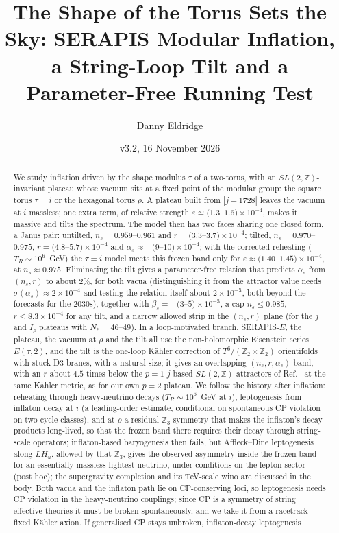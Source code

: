 \documentclass[aps,prd,twocolumn,superscriptaddress,nofootinbib,floatfix]{revtex4-2}
\begin{document}
\title{The Shape of the Torus Sets the Sky: SERAPIS Modular Inflation, a String-Loop Tilt and a Parameter-Free Running Test}
\author{Danny Eldridge}
\date{v3.2, 16 November 2026}
\begin{abstract}
We study inflation driven by the shape modulus $\tau$ of a two-torus, with an $SL(2,\mathbb{Z})$-invariant plateau whose vacuum sits at a fixed point of the modular group: the square torus $\tau=i$ or the hexagonal torus $\rho$. A plateau built from $|j-1728|$ leaves the vacuum at $i$ massless; one extra term, of relative strength $\varepsilon\simeq(1.3$--$1.6)\times10^{-4}$, makes it massive and tilts the spectrum. The model then has two faces sharing one closed form, a Janus pair: untilted, $n_s=0.959$--$0.961$ and $r=(3.3$--$3.7)\times10^{-4}$; tilted, $n_s=0.970$--$0.975$, $r=(4.8$--$5.7)\times10^{-4}$ and $\alpha_s\approx-(9$--$10)\times10^{-4}$; with the corrected reheating ($T_R\sim10^6$~GeV) the $\tau=i$ model meets this frozen band only for $\varepsilon\approx(1.40$--$1.45)\times10^{-4}$, at $n_s\approx0.975$. Eliminating the tilt gives a parameter-free relation that predicts $\alpha_s$ from $(n_s,r)$ to about $2\%$, for both vacua (distinguishing it from the attractor value needs $\sigma(\alpha_s)\approx2\times10^{-4}$ and testing the relation itself about $2\times10^{-5}$, both beyond the forecasts for the 2030s), together with $\beta_s=-(3$--$5)\times10^{-5}$, a cap $n_s\le0.985$, $r\le8.3\times10^{-4}$ for any tilt, and a narrow allowed strip in the $(n_s,r)$ plane (for the $j$ and $I_\rho$ plateaus with $N_*=46$--$49$). In a loop-motivated branch, SERAPIS-$E$, the plateau, the vacuum at $\rho$ and the tilt all use the non-holomorphic Eisenstein series $E(\tau,2)$, and the tilt is the one-loop K\"ahler correction of $T^6/(\mathbb{Z}_2\times\mathbb{Z}_2)$ orientifolds with stuck D3 branes, with a natural size; it gives an overlapping $(n_s,r,\alpha_s)$ band, with an $r$ about $4.5$ times below the $p=1$ $j$-based $SL(2,\mathbb{Z})$ attractors of Ref.~\cite{arXiv_2408_05203} at the same K\"ahler metric, as for our own $p=2$ plateau. We follow the history after inflation: reheating through heavy-neutrino decays ($T_R\sim10^6$~GeV at $i$), leptogenesis from inflaton decay at $i$ (a leading-order estimate, conditional on spontaneous CP violation on two cycle classes), and at $\rho$ a residual $\mathbb{Z}_3$ symmetry that makes the inflaton's decay products long-lived, so that the frozen band there requires their decay through string-scale operators; inflaton-based baryogenesis then fails, but Affleck--Dine leptogenesis along $LH_u$, allowed by that $\mathbb{Z}_3$, gives the observed asymmetry inside the frozen band for an essentially massless lightest neutrino, under conditions on the lepton sector (post hoc); the supergravity completion and its TeV-scale wino are discussed in the body. Both vacua and the inflaton path lie on CP-conserving loci, so leptogenesis needs CP violation in the heavy-neutrino couplings; since CP is a symmetry of string effective theories it must be broken spontaneously, and we take it from a racetrack-fixed K\"ahler axion. If generalised CP stays unbroken, inflaton-decay leptogenesis 
\end{abstract}
\end{document}
